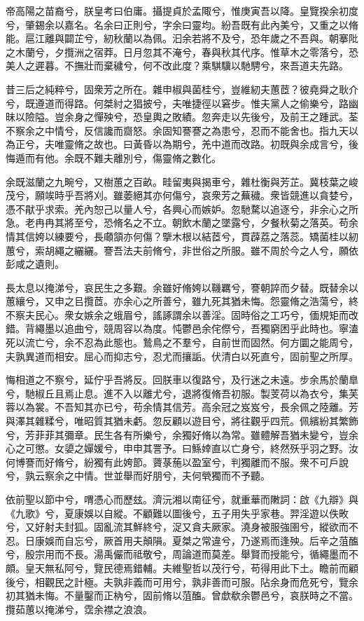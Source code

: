 
\begin{pinyinscope}
帝高陽之苗裔兮，朕皇考曰伯庸。攝提貞於孟陬兮，惟庚寅吾以降。皇覽揆余初度兮，肇錫余以嘉名。名余曰正則兮，字余曰靈均。紛吾既有此內美兮，又重之以脩能。扈江離與闢芷兮，紉秋蘭以為佩。汩余若將不及兮，恐年歲之不吾與。朝搴阰之木蘭兮，夕攬洲之宿莽。日月忽其不淹兮，春與秋其代序。惟草木之零落兮，恐美人之遲暮。不撫壯而棄穢兮，何不改此度？乘騏驥以馳騁兮，來吾道夫先路。

昔三后之純粹兮，固衆芳之所在。雜申椒與菌桂兮，豈維紉夫蕙茝？彼堯舜之耿介兮，既遵道而得路。何桀紂之猖披兮，夫唯捷徑以窘步。惟夫黨人之偷樂兮，路幽昧以險隘。豈余身之憚殃兮，恐皇輿之敗績。忽奔走以先後兮，及前王之踵武。荃不察余之中情兮，反信讒而齌怒。余固知謇謇之為患兮，忍而不能舍也。指九天以為正兮，夫唯靈脩之故也。曰黃昏以為期兮，羌中道而改路。初既與余成言兮，後悔遁而有他。余既不難夫離別兮，傷靈脩之數化。

余既滋蘭之九畹兮，又樹蕙之百畝。畦留夷與揭車兮，雜杜衡與芳芷。冀枝葉之峻茂兮，願竢時乎吾將刈。雖萎絕其亦何傷兮，哀衆芳之蕪穢。衆皆競進以貪婪兮，憑不猒乎求索。羌內恕己以量人兮，各興心而嫉妒。忽馳騖以追逐兮，非余心之所急。老冉冉其將至兮，恐脩名之不立。朝飲木蘭之墜露兮，夕餐秋菊之落英。苟余情其信姱以練要兮，長顑頷亦何傷？擥木根以結茝兮，貫薜荔之落蕊。矯菌桂以紉蕙兮，索胡繩之纚纚。謇吾法夫前脩兮，非世俗之所服。雖不周於今之人兮，願依彭咸之遺則。

長太息以掩涕兮，哀民生之多艱。余雖好脩姱以鞿羈兮，謇朝誶而夕替。既替余以蕙纕兮，又申之㠯攬茝。亦余心之所善兮，雖九死其猶未悔。怨靈脩之浩蕩兮，終不察夫民心。衆女嫉余之蛾眉兮，謠諑謂余以善淫。固時俗之工巧兮，偭規矩而改錯。背繩墨以追曲兮，競周容以為度。忳鬱邑余侘傺兮，吾獨窮困乎此時也。寧溘死以流亡兮，余不忍為此態也。鷙鳥之不羣兮，自前世而固然。何方圜之能周兮，夫孰異道而相安。屈心而抑志兮，忍尤而攘詬。伏清白以死直兮，固前聖之所厚。

悔相道之不察兮，延佇乎吾將反。回朕車以復路兮，及行迷之未遠。步余馬於蘭臯兮，馳椒丘且焉止息。進不入以離尤兮，退將復脩吾初服。製芰荷以為衣兮，集芙蓉以為裳。不吾知其亦已兮，苟余情其信芳。高余冠之岌岌兮，長余佩之陸離。芳與澤其雜糅兮，唯昭質其猶未虧。忽反顧以遊目兮，將往觀乎四荒。佩繽紛其繁飾兮，芳菲菲其彌章。民生各有所樂兮，余獨好脩以為常。雖體解吾猶未變兮，豈余心之可懲。女嬃之嬋媛兮，申申其詈予。曰鯀婞直以亡身兮，終然殀乎羽之野。汝何博謇而好脩兮，紛獨有此姱節。薋菉葹以盈室兮，判獨離而不服。衆不可戶說兮，孰云察余之中情。世並舉而好朋兮，夫何煢獨而不予聽。

依前聖以節中兮，喟憑心而歷玆。濟沅湘以南征兮，就重華而敶詞：啟《九辯》與《九歌》兮，夏康娛以自縱。不顧難以圖後兮，五子用失乎家巷。羿淫遊以佚畋兮，又好射夫封狐。固亂流其鮮終兮，浞又貪夫厥家。澆身被服強圉兮，縱欲而不忍。日康娛而自忘兮，厥首用夫顛隕。夏桀之常違兮，乃遂焉而逢殃。后辛之菹醢兮，殷宗用而不長。湯禹儼而祗敬兮，周論道而莫差。舉賢而授能兮，循繩墨而不頗。皇天無私阿兮，覽民德焉錯輔。夫維聖哲以茂行兮，苟得用此下土。瞻前而顧後兮，相觀民之計極。夫孰非義而可用兮，孰非善而可服。阽余身而危死兮，覽余初其猶未悔。不量鑿而正枘兮，固前脩以菹醢。曾歔欷余鬱邑兮，哀朕時之不當。攬茹蕙以掩涕兮，霑余襟之浪浪。


\end{pinyinscope}
